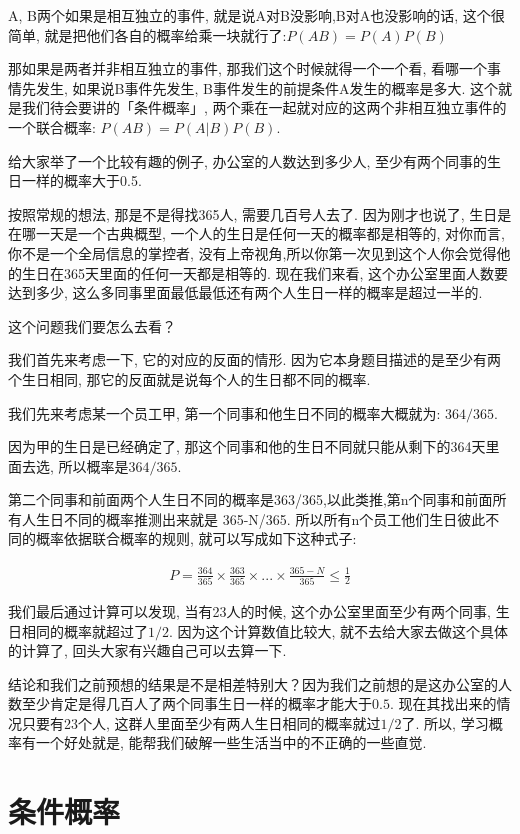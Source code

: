 A, B两个如果是相互独立的事件, 就是说A对B没影响,B对A也没影响的话, 这个很简单, 就是把他们各自的概率给乘一块就行了:$P(AB) = P(A)P(B)$

那如果是两者并非相互独立的事件, 那我们这个时候就得一个一个看, 看哪一个事情先发生, 如果说B事件先发生, B事件发生的前提条件A发生的概率是多大. 这个就是我们待会要讲的「条件概率」, 两个乘在一起就对应的这两个非相互独立事件的一个联合概率: $P(AB) = P(A|B)P(B)$. 

给大家举了一个比较有趣的例子, 办公室的人数达到多少人, 至少有两个同事的生日一样的概率大于0.5. 

按照常规的想法, 那是不是得找365人, 需要几百号人去了. 因为刚才也说了, 生日是在哪一天是一个古典概型, 一个人的生日是任何一天的概率都是相等的, 对你而言, 你不是一个全局信息的掌控者, 没有上帝视角,所以你第一次见到这个人你会觉得他的生日在365天里面的任何一天都是相等的. 现在我们来看, 这个办公室里面人数要达到多少, 这么多同事里面最低最低还有两个人生日一样的概率是超过一半的. 

这个问题我们要怎么去看？

我们首先来考虑一下, 它的对应的反面的情形. 因为它本身题目描述的是至少有两个生日相同, 那它的反面就是说每个人的生日都不同的概率. 

我们先来考虑某一个员工甲, 第一个同事和他生日不同的概率大概就为: $364/365$.

因为甲的生日是已经确定了, 那这个同事和他的生日不同就只能从剩下的364天里面去选, 所以概率是$364/365$. 

第二个同事和前面两个人生日不同的概率是363/365,以此类推,第n个同事和前面所有人生日不同的概率推测出来就是 365-N/365. 所以所有n个员工他们生日彼此不同的概率依据联合概率的规则, 就可以写成如下这种式子: 

\begin{align*}
  P = \frac{364}{365} \times \frac{363}{365} \times ... \times \frac{365-N}{365} \le \frac{1}{2} 
\end{align*}

我们最后通过计算可以发现, 当有23人的时候, 这个办公室里面至少有两个同事, 生日相同的概率就超过了$1/2$. 因为这个计算数值比较大, 就不去给大家去做这个具体的计算了, 回头大家有兴趣自己可以去算一下. 

结论和我们之前预想的结果是不是相差特别大？因为我们之前想的是这办公室的人数至少肯定是得几百人了两个同事生日一样的概率才能大于$0.5$. 现在其找出来的情况只要有23个人, 这群人里面至少有两人生日相同的概率就过$1/2$了. 所以, 学习概率有一个好处就是, 能帮我们破解一些生活当中的不正确的一些直觉. 

\section{条件概率}

